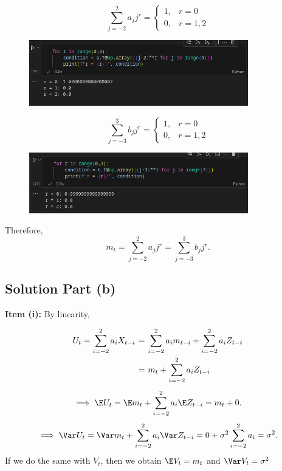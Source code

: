 \[ \sum_{j = -2}^2 a_j j^r = \begin{cases}
    1, & r = 0\\
    0, & r = 1,2
\end{cases} \]

\begin{figure}[H]
    \centering
    \includegraphics[width=0.85\textwidth]{../pictures/hw1ex1.3.1.png}
\end{figure}

\[ \sum_{j = -3}^3 b_j j^r = \begin{cases}
    1, & r = 0\\
    0, & r = 1,2
\end{cases} \]

\begin{figure}[H]
    \centering
    \includegraphics[width=0.85\textwidth]{../pictures/hw1ex1.3.2.png}
\end{figure}

Therefore, 
\[ m_t = \sum_{j = -2}^2 a_j j^r = \sum_{j = -3}^3 b_j j^r. \]

\subsection*{Solution Part (b)}

\textbf{Item (i):} By linearity,
\[ \everymath{\displaystyle}
\arraycolsep=1.8pt\def\arraystretch{2.5}
\begin{array}{rcl}
    U_t = \sum_{i = -2}^2 a_i X_{t-i} & = & \sum_{i = -2}^2 a_i m_{t-i} + \sum_{i = -2}^2 a_i Z_{t-i}\\
    & = & m_t + \sum_{i = -2}^2 a_i Z_{t-i}
\end{array} \]
\[ \implies \E U_t = \E m_t + \sum_{i = -2}^2 a_i \E Z_{t-i} = m_t + 0. \] 
\[ \implies \Var U_t = \Var m_t + \sum_{i = -2}^2 a_i \Var Z_{t-i} = 0 + \sigma^2 \sum_{i = -2}^2 a_i = \sigma^2 . \] 
If we do the same with $V_t$, then we obtain $\E V_t = m_t$ and $\Var V_t = \sigma^2$

